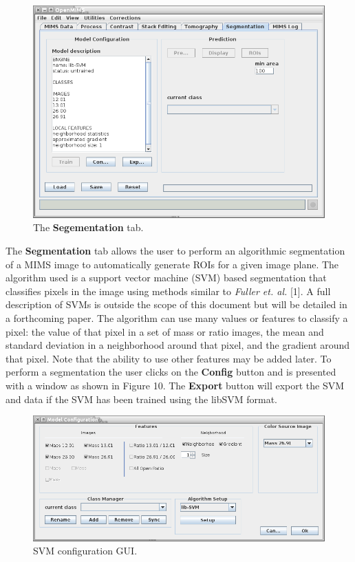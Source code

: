 \documentclass{article}
\begin{document}
	\begin{figure}[h]
	\centering
	\includegraphics[scale=0.70]{snapshot_MimsSegmentation.png}
	\caption{The \textbf{Segementation} tab.}
	\end{figure}
	The \textbf{Segmentation} tab allows the user to perform an algorithmic segmentation of a MIMS image to automatically generate ROIs for a given image plane. The algorithm used is a support vector machine (SVM) based segmentation that classifies pixels in the image using methods similar to \textit{Fuller et. al.} [1]. A full description of SVMs is outside the scope of this document but will be detailed in a forthcoming paper.  The algorithm can use many values or features to classify a pixel: the value of that pixel in a set of mass or ratio images, the mean and standard deviation in a neighborhood around that pixel, and the gradient around that pixel. Note that the ability to use other features may be added later. To perform a segmentation the user clicks on the \textbf{Config} button and is presented with a window as shown in Figure 10.  The \textbf{Export} button will export the SVM and data if the SVM has been trained using the libSVM format.

	\begin{figure}[h]
	\centering
	\includegraphics[scale=0.65]{snapshot_Model_Config.png}
	\caption{SVM configuration GUI.}
	\end{figure}
\end{document}
